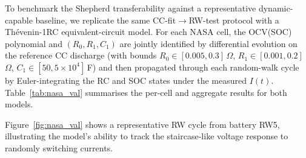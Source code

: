 \documentclass[5p,times,number]{elsarticle}
\newcommand{\figref}[1]{\hyperref[#1]{\textup{Figure~\ref*{#1}}}}
\newcommand{\tabref}[1]{\hyperref[#1]{\textup{Table~\ref*{#1}}}}
\def\figref#1{Figure~\ref{#1}}
\def\tabref#1{Table~\ref{#1}}
\begin{document}
To benchmark the Shepherd transferability against a representative dynamic-capable baseline, we replicate the same CC-fit$\to$RW-test protocol with a Th\'{e}venin-1RC equivalent-circuit model. For each NASA cell, the OCV(SOC) polynomial and $(R_0, R_1, C_1)$ are jointly identified by differential evolution on the reference CC discharge (with bounds $R_0 \in [0.005, 0.3]$\,$\Omega$, $R_1 \in [0.001, 0.2]$\,$\Omega$, $C_1 \in [50, 5\!\times\!10^4]$\,F) and then propagated through each random-walk cycle by Euler-integrating the RC and SOC states under the measured $I(t)$. \tabref{tab:nasa_val} summarises the per-cell and aggregate results for both models.
\begin{table}[!tb]
\caption{Dynamic validation on NASA random-walk data: the proposed Shepherd model versus a Th\'{e}venin-1RC ECM, both calibrated only on the reference CC discharges and applied to the random-walk cycles \emph{without re-fitting}. Values are mean $\pm$ std across cycles; aggregate is over all 200 cycles.}\label{tab:nasa_val}
\centering
{}
\end{table}
\figref{fig:nasa_val} shows a representative RW cycle from battery RW5, illustrating the model's ability to track the staircase-like voltage response to randomly switching currents.
\end{document}
